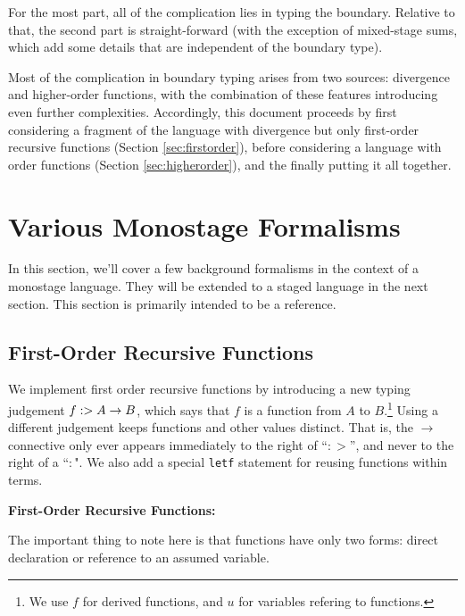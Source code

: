 \documentclass[]{article}
\begin{document}
\begin{abstrsyn}
For the most part, all of the complication lies in typing the boundary.
Relative to that, the second part is straight-forward 
(with the exception of mixed-stage sums, which add some details that are independent of the boundary type).

Most of the complication in boundary typing arises from two sources: divergence and higher-order functions,
with the combination of these features introducing even further complexities.
Accordingly, this document proceeds by first considering a fragment of the language with
divergence but only first-order recursive functions (Section \ref{sec:firstorder}),
before considering a language with order functions (Section \ref{sec:higherorder}),
and the finally putting it all together.

\section{Various Monostage Formalisms}

In this section, we'll cover a few background formalisms in the context of a monostage language.
They will be extended to a staged language in the next section.
This section is primarily intended to be a reference.

\subsection{First-Order Recursive Functions}

We implement first order recursive functions by introducing a new typing judgement \mbox{$f :> A \to B$},
which says that $f$ is a function from $A$ to $B$.\footnote{We use $f$ for derived functions, and $u$ for variables refering to functions.}  
Using a different judgement keeps functions and other values distinct.
That is, the $\to$ connective only ever appears immediately to the right of ``$:>$'', and never to the right of a ``$:$".
We also add a special {\tt letf} statement for reusing functions within terms.

\begin{framed}
\noindent\textbf{First-Order Recursive Functions:}
\end{framed}
The important thing to note here is that functions have only two forms: direct declaration or reference to an assumed variable.


\end{abstrsyn}
\end{document}
